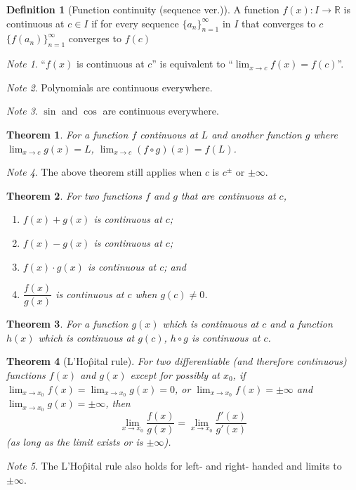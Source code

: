 \documentclass{article}
\theoremstyle{plain}
\newtheorem{theorem}{Theorem}[section]
\numberwithin{theorem}{section}
\theoremstyle{definition}
\newtheorem{definition}{Definition}[section]
\numberwithin{definition}{section}
\theoremstyle{remark}
\newtheorem{note}{Note}[section]
\numberwithin{note}{section}
\newcommand*{\R}{\mathbb{R}}
\begin{document}
%
\begin{definition}[Function continuity (sequence ver.)]
    A function $f(x):I\to\R$ is continuous at $c \in I$ if
    for every sequence $\{a_n\}^{\infty}_{n=1}$ in $I$ that converges to $c$
    $\{f(a_n)\}^{\infty}_{n=1}$ converges to $f(c)$
\end{definition}
%
\begin{note}
    ``$f(x)$ is continuous at $c$'' is equivalent to
    ``$\displaystyle \lim_{x\to c} f(x) = f(c)$''.
\end{note}
%
\begin{note}
    Polynomials are continuous everywhere.
\end{note}
%
\begin{note}
    $\sin$ and $\cos$ are continuous everywhere.
\end{note}
%
\begin{theorem}
    For a function $f$ continuous at $L$
    and another function $g$ where $\displaystyle \lim_{x\to c}g(x) = L$,
    $\displaystyle \lim_{x\to c} (f \circ g)(x) = f(L)$.
\end{theorem}
\begin{note}
    The above theorem still applies when $c$ is $c^\pm$ or $\pm\infty$.
\end{note}
%
\begin{theorem}
    For two functions $f$ and $g$ that are continuous at $c$,
    \begin{enumerate}[label=\normalfont\alph*)]
        \item $f(x) + g(x)$ is continuous at $c$;
        \item $f(x) - g(x)$ is continuous at $c$;
        \item $f(x) \cdot g(x)$ is continuous at $c$; and
        \item $\dfrac{f(x)}{g(x)}$ is continuous at $c$ when $g(c)\ne0$.
    \end{enumerate}
\end{theorem}
%
\begin{theorem}
    For a function $g(x)$ which is continuous at $c$ and
    a function $h(x)$ which is continuous at $g(c)$,
    $h \circ g$ is continuous at $c$.
\end{theorem}
%
\begin{theorem}[L'Ho\^pital rule]
    For two differentiable (and therefore continuous) functions $f(x)$ and $g(x)$
    except for possibly at $x_0$,
    if $\displaystyle \lim_{x\to x_0}f(x)=\lim_{x\to x_0}g(x)=0$,
    or $\displaystyle \lim_{x\to x_0}f(x)=\pm\infty$
        and $\displaystyle \lim_{x\to x_0}g(x)=\pm\infty$,
    then
    \[ \lim_{x\to x_0}\frac{f(x)}{g(x)} = \lim_{x\to x_0}\frac{f'(x)}{g'(x)} \]
    (as long as the limit exists or is $\pm\infty$).
\end{theorem}
%
\begin{note}
    The L'Ho\^pital rule also holds for left- and right- handed and limits to $\pm\infty$.
\end{note}
\end{document}
